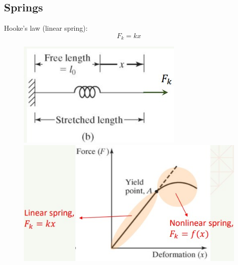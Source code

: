 \subsection{Springs}
Hooke's law (linear spring):
\begin{equation}
    F_k = kx
\end{equation}
\begin{figure}[H]
    \centering
    \begin{minipage}{.5\textwidth}
        \centering
        \includegraphics[width=.8\linewidth]{./img/diagram14.jpg}
    \end{minipage}%
    \begin{minipage}{.5\textwidth}
        \centering
        \includegraphics[width=.8\linewidth]{./img/diagram15.jpg}
    \end{minipage}
\end{figure}
